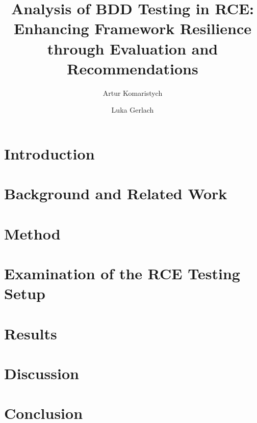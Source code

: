 \documentclass[runningheads]{llncs}
\begin{document}
%
\title{Analysis of BDD Testing in RCE: Enhancing Framework Resilience through Evaluation and Recommendations}
%
%
\author{Artur Komaristych \and Luka Gerlach}
%
%
%
\maketitle              %
%
\begin{abstract}

\end{abstract}
%
%
%
\section{Introduction}

\section{Background and Related Work}

\section{Method}

\section{Examination of the RCE Testing Setup}

\section{Results}
\label{sec:results}

\section{Discussion}
\label{sec:discussion}

\section{Conclusion}


%
%
%
\clearpage


\end{document}
